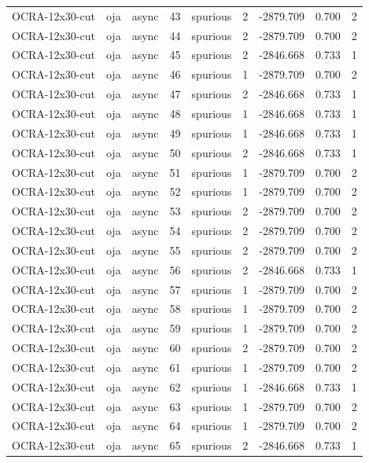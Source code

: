 \begin{tabular}{lllrlrrrr}
OCRA-12x30-cut & oja & async & 43 & spurious & 2 & -2879.709 & 0.700 & 2 \\
OCRA-12x30-cut & oja & async & 44 & spurious & 2 & -2879.709 & 0.700 & 2 \\
OCRA-12x30-cut & oja & async & 45 & spurious & 2 & -2846.668 & 0.733 & 1 \\
OCRA-12x30-cut & oja & async & 46 & spurious & 1 & -2879.709 & 0.700 & 2 \\
OCRA-12x30-cut & oja & async & 47 & spurious & 2 & -2846.668 & 0.733 & 1 \\
OCRA-12x30-cut & oja & async & 48 & spurious & 1 & -2846.668 & 0.733 & 1 \\
OCRA-12x30-cut & oja & async & 49 & spurious & 1 & -2846.668 & 0.733 & 1 \\
OCRA-12x30-cut & oja & async & 50 & spurious & 2 & -2846.668 & 0.733 & 1 \\
OCRA-12x30-cut & oja & async & 51 & spurious & 1 & -2879.709 & 0.700 & 2 \\
OCRA-12x30-cut & oja & async & 52 & spurious & 1 & -2879.709 & 0.700 & 2 \\
OCRA-12x30-cut & oja & async & 53 & spurious & 2 & -2879.709 & 0.700 & 2 \\
OCRA-12x30-cut & oja & async & 54 & spurious & 2 & -2879.709 & 0.700 & 2 \\
OCRA-12x30-cut & oja & async & 55 & spurious & 2 & -2879.709 & 0.700 & 2 \\
OCRA-12x30-cut & oja & async & 56 & spurious & 2 & -2846.668 & 0.733 & 1 \\
OCRA-12x30-cut & oja & async & 57 & spurious & 1 & -2879.709 & 0.700 & 2 \\
OCRA-12x30-cut & oja & async & 58 & spurious & 1 & -2879.709 & 0.700 & 2 \\
OCRA-12x30-cut & oja & async & 59 & spurious & 1 & -2879.709 & 0.700 & 2 \\
OCRA-12x30-cut & oja & async & 60 & spurious & 2 & -2879.709 & 0.700 & 2 \\
OCRA-12x30-cut & oja & async & 61 & spurious & 1 & -2879.709 & 0.700 & 2 \\
OCRA-12x30-cut & oja & async & 62 & spurious & 1 & -2846.668 & 0.733 & 1 \\
OCRA-12x30-cut & oja & async & 63 & spurious & 1 & -2879.709 & 0.700 & 2 \\
OCRA-12x30-cut & oja & async & 64 & spurious & 1 & -2879.709 & 0.700 & 2 \\
OCRA-12x30-cut & oja & async & 65 & spurious & 2 & -2846.668 & 0.733 & 1 \\

\end{tabular}
